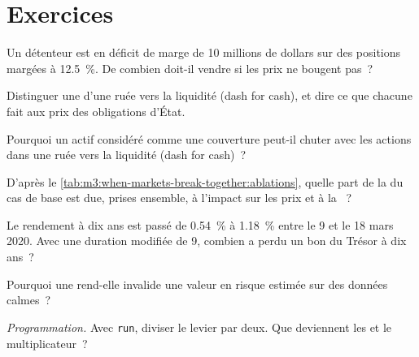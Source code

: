 \section{Exercices}

\begin{exercise}[$\star$]\label{exo:m3:when-markets-break-together:1}
Un détenteur est en déficit de marge de 10 millions de dollars sur des positions margées à 12.5~\%. De combien doit-il vendre si les prix ne bougent pas~?
\end{exercise}

\begin{exercise}[$\star$]\label{exo:m3:when-markets-break-together:2}
Distinguer une  d'une ruée vers la liquidité (dash for cash), et dire ce que chacune fait aux prix des obligations d'État.
\end{exercise}

\begin{exercise}[$\star$]\label{exo:m3:when-markets-break-together:3}
Pourquoi un actif considéré comme une couverture peut-il chuter avec les actions dans une ruée vers la liquidité (dash for cash)~?
\end{exercise}

\begin{exercise}[$\star\star$]\label{exo:m3:when-markets-break-together:4}
D'après le \cref{tab:m3:when-markets-break-together:ablations}, quelle part de la  du cas de base est due, prises ensemble, à l'impact sur les prix et à la ~?
\end{exercise}

\begin{exercise}[$\star\star$]\label{exo:m3:when-markets-break-together:5}
Le rendement à dix ans est passé de 0.54~\% à 1.18~\% entre le 9 et le 18 mars 2020. Avec une duration modifiée de 9, combien a perdu un bon du Trésor à dix ans~?
\end{exercise}

\begin{exercise}[$\star\star$]\label{exo:m3:when-markets-break-together:6}
Pourquoi une  rend-elle invalide une valeur en risque estimée sur des données calmes~?
\end{exercise}

\begin{exercise}[$\star\star\star$]\label{exo:m3:when-markets-break-together:7}
\emph{Programmation.} Avec \texttt{run}, diviser le levier par deux. Que deviennent les  et le multiplicateur~?
\end{exercise}

